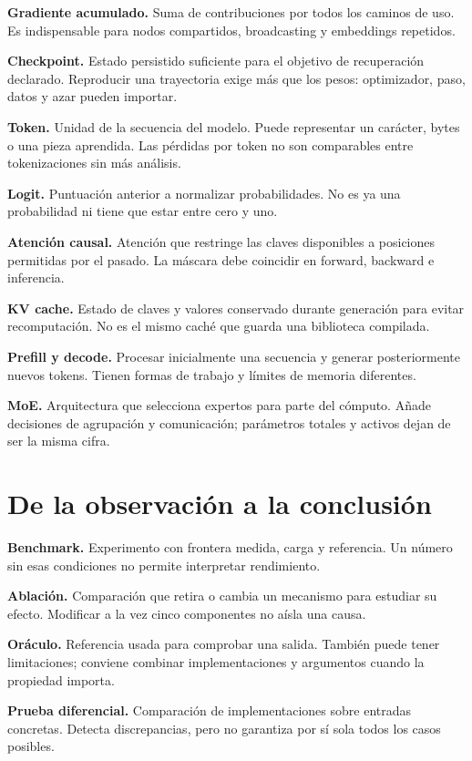 \documentclass[12pt,a4paper,oneside]{report}
\begin{document}
\textbf{Gradiente acumulado.} Suma de contribuciones por todos los caminos de uso. Es indispensable para nodos compartidos, broadcasting y embeddings repetidos.

\textbf{Checkpoint.} Estado persistido suficiente para el objetivo de recuperación declarado. Reproducir una trayectoria exige más que los pesos: optimizador, paso, datos y azar pueden importar.

\textbf{Token.} Unidad de la secuencia del modelo. Puede representar un carácter, bytes o una pieza aprendida. Las pérdidas por token no son comparables entre tokenizaciones sin más análisis.

\textbf{Logit.} Puntuación anterior a normalizar probabilidades. No es ya una probabilidad ni tiene que estar entre cero y uno.

\textbf{Atención causal.} Atención que restringe las claves disponibles a posiciones permitidas por el pasado. La máscara debe coincidir en forward, backward e inferencia.

\textbf{KV cache.} Estado de claves y valores conservado durante generación para evitar recomputación. No es el mismo caché que guarda una biblioteca compilada.

\textbf{Prefill y decode.} Procesar inicialmente una secuencia y generar posteriormente nuevos tokens. Tienen formas de trabajo y límites de memoria diferentes.

\textbf{MoE.} Arquitectura que selecciona expertos para parte del cómputo. Añade decisiones de agrupación y comunicación; parámetros totales y activos dejan de ser la misma cifra.

\section{De la observación a la conclusión}
\textbf{Benchmark.} Experimento con frontera medida, carga y referencia. Un número sin esas condiciones no permite interpretar rendimiento.

\textbf{Ablación.} Comparación que retira o cambia un mecanismo para estudiar su efecto. Modificar a la vez cinco componentes no aísla una causa.

\textbf{Oráculo.} Referencia usada para comprobar una salida. También puede tener limitaciones; conviene combinar implementaciones y argumentos cuando la propiedad importa.

\textbf{Prueba diferencial.} Comparación de implementaciones sobre entradas concretas. Detecta discrepancias, pero no garantiza por sí sola todos los casos posibles.
\end{document}
